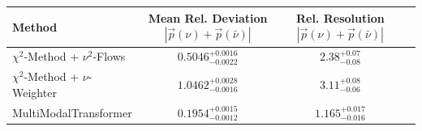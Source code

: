     \begin{tabular}{lccc}
        \toprule
        Method & Mean Rel. Deviation $|\vec{p}(\nu) + \vec{p}(\bar{\nu})|$ & Rel. Resolution $|\vec{p}(\nu) + \vec{p}(\bar{\nu})|$ \\
        \midrule
        $\chi^2$-Method + $\nu^2$-Flows & $0.5046^{+0.0016}_{-0.0022}$ & $2.38^{+0.07}_{-0.08}$ \\
        $\chi^2$-Method + $\nu$-Weighter & $1.0462^{+0.0028}_{-0.0016}$ & $3.11^{+0.08}_{-0.06}$ \\
        MultiModalTransformer & $0.1954^{+0.0015}_{-0.0012}$ & $1.165^{+0.017}_{-0.016}$ \\
        \bottomrule
    \end{tabular}
